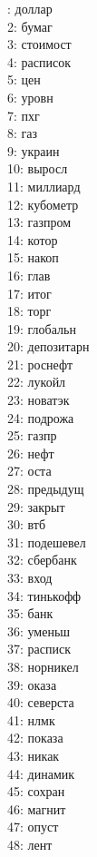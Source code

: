 \documentclass[14pt]{matmex-diploma-custom}
\begin{document}
\begin{appendices}
\begin{multicols}{4}
: доллар\\
2: бумаг\\
3: стоимост\\
4: расписок\\
5: цен\\
6: уровн\\
7: пхг\\
8: газ\\
9: украин\\
10: выросл\\
11: миллиард\\
12: кубометр\\
13: газпром\\
14: котор\\
15: накоп\\
16: глав\\
17: итог\\
18: торг\\
19: глобальн\\
20: депозитарн\\
21: роснефт\\
22: лукойл\\
23: новатэк\\
24: подрожа\\
25: газпр\\
26: нефт\\
27: оста\\
28: предыдущ\\
29: закрыт\\
30: втб\\
31: подешевел\\
32: сбербанк\\
33: вход\\
34: тинькофф\\
35: банк\\
36: уменьш\\
37: расписк\\
38: норникел\\
39: оказа\\
40: северста\\
41: нлмк\\
42: показа\\
43: никак\\
44: динамик\\
45: сохран\\
46: магнит\\
47: опуст\\
48: лент\\

\end{multicols}
\end{appendices}
\end{document}
